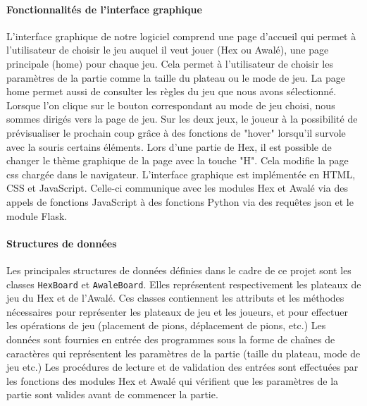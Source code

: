 \paragraph{Fonctionnalités de l'interface graphique}
L'interface graphique de notre logiciel comprend une page d'accueil qui permet à l'utilisateur
de choisir le jeu auquel il veut jouer (Hex ou Awalé), une page principale (home) pour chaque jeu.
Cela permet à l'utilisateur de choisir les paramètres de la partie comme la taille du plateau ou le 
mode de jeu. La page home permet aussi de consulter les règles du jeu que nous avons sélectionné.
Lorsque l'on clique sur le bouton correspondant au mode de jeu choisi, nous sommes dirigés vers la page de
jeu.
Sur les deux jeux, le joueur à la possibilité de prévisualiser le prochain coup grâce à des fonctions de "hover" lorsqu'il survole avec 
la souris certains éléments.
Lors d'une partie de Hex, il est possible de changer le thème graphique de la page avec la touche "H". Cela modifie la page css chargée dans le navigateur.
L'interface graphique est implémentée en HTML, CSS et JavaScript. Celle-ci communique avec les modules Hex et Awalé via des appels de fonctions JavaScript à des
fonctions Python via des requêtes json et le module Flask.

\paragraph{Structures de données}
Les principales structures de données définies dans le cadre de ce projet sont les classes
\texttt{HexBoard} et \texttt{AwaleBoard}. Elles représentent respectivement les plateaux de jeu du Hex et de
l'Awalé. Ces classes contiennent les attributs et les méthodes nécessaires
pour représenter les plateaux de jeu et les joueurs, et pour effectuer les opérations de jeu
(placement de pions, déplacement de pions, etc.) Les données sont fournies en entrée des programmes
sous la forme de chaînes de caractères qui représentent les paramètres de la partie (taille du
plateau, mode de jeu etc.) Les procédures de lecture et de validation
des entrées sont effectuées par les fonctions des modules Hex et Awalé qui vérifient que les
paramètres de la partie sont valides avant de commencer la partie.

